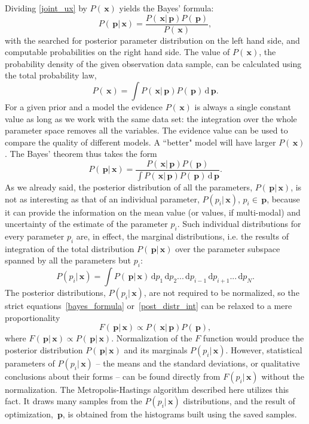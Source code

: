 \documentclass[preprint2]{aastex}
\newcommand{\ud}{\,\mathrm{d}}
\newcommand{\bp}{\,\mathbf{p}}
\newcommand{\bx}{\,\mathbf{x}}
\begin{document}
Dividing \eqref{joint_ux} by $P(\bx)$ yields the Bayes' formula:
\begin{equation}
  \label{bayes_formula}
  P(\bp|\bx) =  \frac{P(\bx|\bp)P(\bp)}{P(\bx)},
\end{equation}
with the searched for posterior parameter distribution on the left hand side, and computable probabilities on the right hand side. The value of $P(\bx)$, the probability density of the given observation data sample, can be calculated using the total probability law,
\begin{equation}
  P(\bx) = \int P(\bx|\bp)P(\bp) \ud \bp.
\end{equation}
For a given prior and a model the evidence $P(\bx)$ is always a single constant value as long as we work with the same data set: the integration over the whole parameter space removes all the variables. The evidence value can be used to compare the quality of different models. A ``better" model will have larger $P(\bx)$. The Bayes' theorem thus takes the form
\begin{equation}
  \label{post_distr_int}
  P(\bp|\bx) =  \frac{P(\bx|\bp)P(\bp)}{\int P(\bx|\bp)P(\bp) \ud \bp}.
\end{equation}
As we already said, the posterior distribution of all the parameters, $P(\bp|\bx)$, is not as interesting as that of an individual parameter, $P(p_i|\bx)$, $p_i \in \bp$, because it can provide the information on the mean value (or values, if multi-modal) and uncertainty of the estimate of the parameter $p_i$. Such individual distributions for every parameter $p_i$ are, in effect, the marginal distributions, i.e. the results of integration of the total distribution $P(\bp|\bx)$ over the parameter subspace spanned by all the parameters but $p_i$:
\begin{equation}
  \label{param_post_distr}
  P(p_i|\bx) =  \int P(\bp|\bx)\ud p_1 \ud p_2 ... \ud p_{i-1} \ud p_{i+1} ... \ud p_N.
\end{equation}
The posterior distributions, $P(p_i|\bx)$, are not required to be normalized, so the strict equations~\eqref{bayes_formula} or~\eqref{post_distr_int} can be relaxed to a mere proportionality
\begin{equation}
  \label{bayes_propor}
  F(\bp|\bx) \propto P(\bx|\bp)P(\bp),
\end{equation}
where $F(\bp|\bx) \propto P(\bp|\bx)$. Normalization of the $F$ function would produce the posterior distribution $P(\bp|\bx)$ and its marginals $P(p_i|\bx)$. However, statistical parameters of $P(p_i|\bx)$ -- the means and the standard deviations, or qualitative conclusions about their forms -- can be found directly from $F(p_i|\bx)$ without the normalization. The Metropolis-Hastings algorithm described here utilizes this fact. It draws many samples from the $P(p_i|\bx)$ distributions, and the result of optimization, $\bp$, is obtained from the histograms built using the saved samples. 
\end{document}
